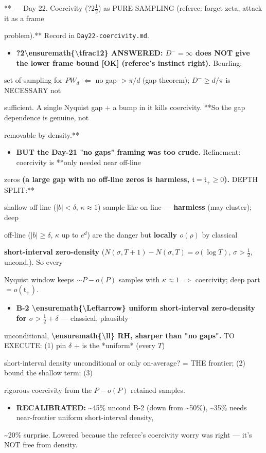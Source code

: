 \documentclass[10pt]{article}
\begin{document}
** --- Day 22. Coercivity (?2\ensuremath{\tfrac12}) as PURE SAMPLING (referee: forget zeta, attack it as a frame\par
problem).** Record in \texttt{Day22-coercivity.md}.\par
\begin{itemize}
\item \textbf{?2\textbackslash{}ensuremath\{\textbackslash{}tfrac12\} ANSWERED: $D^-=\infty$ does NOT give the lower frame bound [OK] (referee's instinct right).} Beurling:
\end{itemize}
  set of sampling for $PW_d$ $\Leftarrow$ no gap $>\pi/d$ (gap theorem); $D^-\ge d/\pi$ is NECESSARY not\par
  sufficient. A single Nyquist gap + a bump in it kills coercivity. **So the gap dependence is genuine, not\par
  removable by density.**\par
\begin{itemize}
\item \textbf{BUT the Day-21 "no gaps" framing was too crude.} Refinement: coercivity is **only needed near off-line
\end{itemize}
  zeros\textbf{ (a large gap with no off-line zeros is harmless, $\mathfrak t=\mathfrak t_+\ge0$). }DEPTH SPLIT:**\par
  shallow off-line ($|b|<\delta$, $\kappa\approx1$) sample like on-line --- \textbf{harmless} (may cluster); deep\par
  off-line ($|b|\ge\delta$, $\kappa$ up to $e^d$) are the danger but \textbf{locally $o(\rho)$} by classical\par
  \textbf{short-interval zero-density} ($N(\sigma,T+1)-N(\sigma,T)=o(\log T)$, $\sigma>\tfrac12$, uncond.). So every\par
  Nyquist window keeps $\sim P-o(P)$ samples with $\kappa\approx1$ \ensuremath{\Rightarrow} coercivity; deep part $=o(\mathfrak t_+)$.\par
\begin{itemize}
\item \textbf{B-2 \textbackslash{}ensuremath\{\textbackslash{}Leftarrow\} uniform short-interval zero-density for $\sigma>\tfrac12+\delta$} --- classical, plausibly
\end{itemize}
  unconditional, \textbf{\textbackslash{}ensuremath\{\textbackslash{}ll\} RH, sharper than "no gaps".} TO EXECUTE: (1) pin $\delta$ + is the *uniform* (every $T$)\par
  short-interval density unconditional or only on-average? = THE frontier; (2) bound the shallow term; (3)\par
  rigorous coercivity from the $P-o(P)$ retained samples.\par
\begin{itemize}
\item \textbf{RECALIBRATED:} \textasciitilde{}45\% uncond B-2 (down from \textasciitilde{}50\%), \textasciitilde{}35\% needs near-frontier uniform short-interval density,
\end{itemize}
  \textasciitilde{}20\% surprise. Lowered because the referee's coercivity worry was right --- it's NOT free from density.\par
\end{document}
